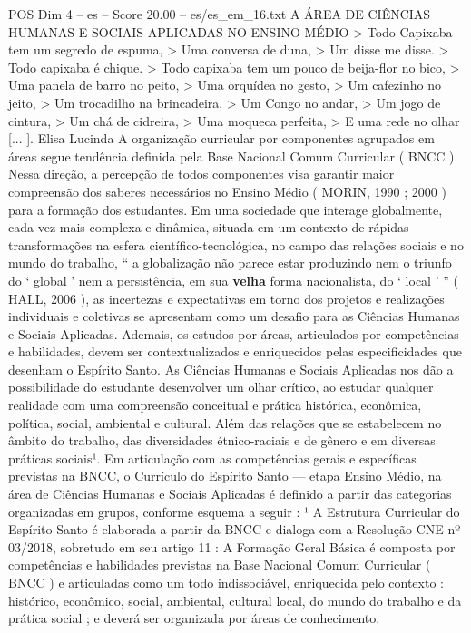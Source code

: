 \begin{textsample}{POS Dim 4 – es – Score 20.00 – es/es\_em\_16.txt}  \label{ex:f4_pos_072}
A ÁREA DE CIÊNCIAS HUMANAS E SOCIAIS APLICADAS NO ENSINO MÉDIO > Todo Capixaba tem um segredo de espuma, > Uma conversa de duna, > Um disse me disse. > Todo capixaba é chique. > Todo capixaba tem um pouco de beija-flor no bico, > Uma panela de barro no peito, > Uma orquídea no gesto, > Um cafezinho no jeito, > Um trocadilho na brincadeira, > Um Congo no andar, > Um jogo de cintura, > Um chá de cidreira, > Uma moqueca perfeita, > E uma rede no olhar [... ].
Elisa Lucinda A organização curricular por componentes agrupados em áreas segue tendência definida pela Base Nacional Comum Curricular ( BNCC ).
Nessa direção, a percepção de todos componentes visa garantir maior compreensão dos saberes necessários no Ensino Médio ( MORIN, 1990 ; 2000 ) para a formação dos estudantes.
Em uma sociedade que interage globalmente, cada vez mais complexa e dinâmica, situada em um contexto de rápidas transformações na esfera científico-tecnológica, no campo das relações sociais e no mundo do trabalho, “ a globalização não parece estar produzindo nem o triunfo do ‘ global ’ nem a persistência, em sua \textbf{velha} forma nacionalista, do ‘ local ’ ” ( HALL, 2006 ), as incertezas e expectativas em torno dos projetos e realizações individuais e coletivas se apresentam como um desafio para as Ciências Humanas e Sociais Aplicadas.
Ademais, os estudos por áreas, articulados por competências e habilidades, devem ser contextualizados e enriquecidos pelas especificidades que desenham o Espírito Santo.
As Ciências Humanas e Sociais Aplicadas nos dão a possibilidade do estudante desenvolver um olhar crítico, ao estudar qualquer realidade com uma compreensão conceitual e prática histórica, econômica, política, social, ambiental e cultural.
Além das relações que se estabelecem no âmbito do trabalho, das diversidades étnico-raciais e de gênero e em diversas práticas sociais¹.
Em articulação com as competências gerais e específicas previstas na BNCC, o Currículo do Espírito Santo — etapa Ensino Médio, na área de Ciências Humanas e Sociais Aplicadas é definido a partir das categorias organizadas em grupos, conforme esquema a seguir : ¹ A Estrutura Curricular do Espírito Santo é elaborada a partir da BNCC e dialoga com a Resolução CNE nº 03/2018, sobretudo em seu artigo 11 : A Formação Geral Básica é composta por competências e habilidades previstas na Base Nacional Comum Curricular ( BNCC ) e articuladas como um todo indissociável, enriquecida pelo contexto : histórico, econômico, social, ambiental, cultural local, do mundo do trabalho e da prática social ; e deverá ser organizada por áreas de conhecimento.

\end{textsample}
